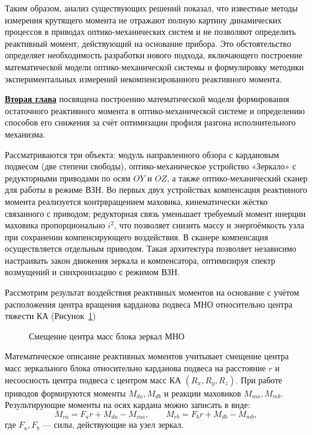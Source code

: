 Таким образом, анализ существующих решений показал, что известные методы измерения крутящего момента не отражают полную картину динамических процессов в приводах оптико-механических систем и не позволяют определить реактивный момент, действующий на основание прибора.
Это обстоятельство определяет необходимость разработки нового подхода, включающего построение математической модели оптико-механической системы и формулировку методики экспериментальных измерений некомпенсированного реактивного момента.


\underline{\textbf{Вторая глава}} посвящена построению математической модели формирования остаточного реактивного момента в оптико-механической системе и определению способов его снижения за счёт оптимизации профиля разгона исполнительного механизма.

Рассматриваются три объекта: модуль направленного обзора с кардановым подвесом (две степени свободы), оптико-механическое устройство «Зеркало» с редукторными приводами по осям $OY$ и $OZ$, а также оптико-механический сканер для работы в режиме ВЗН. Во первых двух устройствах компенсация реактивного момента реализуется контрвращением маховика, кинематически жёстко связанного с приводом; редукторная связь уменьшает требуемый момент инерции маховика пропорционально $i^2$, что позволяет снизить массу и энергоёмкость узла при сохранении компенсирующего воздействия. В сканере компенсация осуществляется отдельным приводом. Такая архитектура позволяет независимо настраивать закон движения зеркала и компенсатора, оптимизируя спектр возмущений и синхронизацию с режимом ВЗН.

Рассмотрим результат воздействия реактивных моментов на основание с учётом расположения центра вращения карданова подвеса МНО относительно центра тяжести КА (Рисунок~\cref{fig:tikz_YPK})
\begin{figure}[h!]
	\legend{}
	\caption[Пример \texttt{tikz} схемы]{Смещение центра масс блока зеркал МНО}\label{fig:tikz_YPK}
\end{figure}

Математическое описание реактивных моментов учитывает смещение центра масс зеркального блока относительно карданова подвеса на расстояние $r$ и несоосность центра подвеса с центром масс КА $(R_x,R_y,R_z)$. При работе приводов формируются моменты $M_{da}, M_{db}$ и реакции маховиков $M_{ma}, M_{mb}$. Результирующие моменты на осях кардана можно записать в виде:
\begin{equation}
	M_{ra} = F_a r + M_{da} - M_{ma}, 
	\qquad 
	M_{rb} = F_b r + M_{db} - M_{mb},
\end{equation}
где $F_a, F_b$ --- силы, действующие на узел зеркал. 

